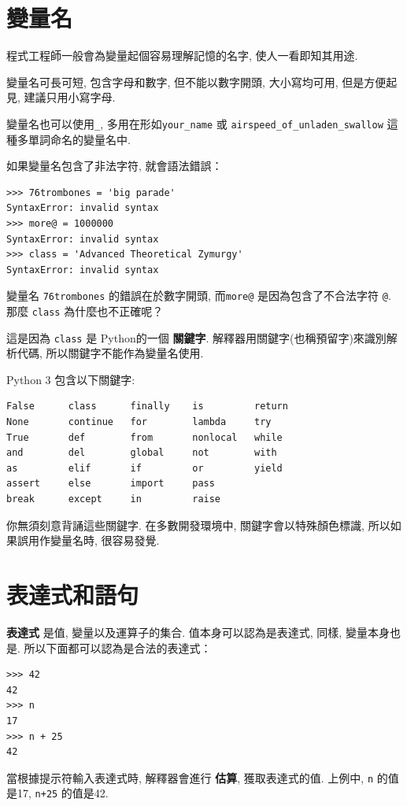 \documentclass[10pt]{book}
\begin{document}
\section{變量名}

程式工程師一般會為變量起個容易理解記憶的名字, 使人一看即知其用途. 

變量名可長可短, 包含字母和數字, 但不能以數字開頭, 
大小寫均可用, 但是方便起見, 建議只用小寫字母. 

變量名也可以使用\verb"_",  多用在形如\verb"your_name" 或 
\verb"airspeed_of_unladen_swallow" 這種多單詞命名的變量名中. 

如果變量名包含了非法字符, 就會語法錯誤：

\begin{verbatim}
>>> 76trombones = 'big parade'
SyntaxError: invalid syntax
>>> more@ = 1000000
SyntaxError: invalid syntax
>>> class = 'Advanced Theoretical Zymurgy'
SyntaxError: invalid syntax
\end{verbatim}
%
變量名 {\tt 76trombones}  的錯誤在於數字開頭, 
而{\tt more@} 是因為包含了不合法字符 {\tt @}. 
那麼 {\tt class} 為什麼也不正確呢？

這是因為 {\tt class} 是 Python的一個 {\bf 關鍵字}. 
解釋器用關鍵字(也稱預留字)來識別解析代碼, 所以關鍵字不能作為變量名使用. 

Python 3 包含以下關鍵字:

\begin{verbatim}
False      class      finally    is         return
None       continue   for        lambda     try
True       def        from       nonlocal   while
and        del        global     not        with
as         elif       if         or         yield
assert     else       import     pass
break      except     in         raise
\end{verbatim}
%

你無須刻意背誦這些關鍵字. 在多數開發環境中, 關鍵字會以特殊顏色標識, 
所以如果誤用作變量名時, 很容易發覺. 

\section{表達式和語句}

{\bf 表達式} 是值, 變量以及運算子的集合. 
值本身可以認為是表達式, 同樣, 變量本身也是. 
所以下面都可以認為是合法的表達式：

\begin{verbatim}
>>> 42
42
>>> n
17
>>> n + 25
42
\end{verbatim}
%
當根據提示符輸入表達式時, 解釋器會進行 {\bf 估算}, 獲取表達式的值. 
上例中, {\tt n} 的值是17, {\tt n+25} 的值是42. 
\end{document}
